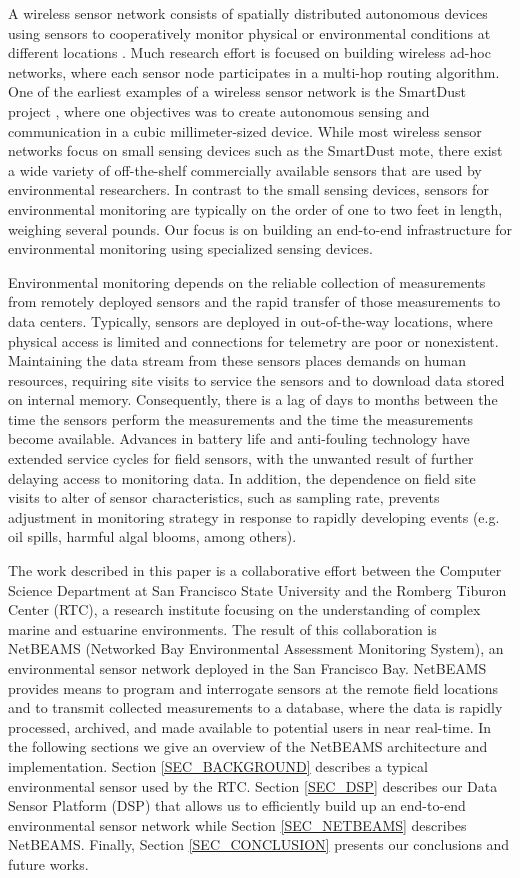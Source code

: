 \documentclass[conference]{IEEEtran}
\begin{document}
A wireless sensor network consists of spatially distributed autonomous
devices using sensors to cooperatively monitor physical or
environmental conditions at different locations \cite{roemer:2004}.
Much research effort is focused on building wireless ad-hoc networks, 
where each sensor node participates in a multi-hop routing algorithm.
One of the earliest examples of a wireless sensor network is the
SmartDust project \cite{smartdust:2001}, where one objectives was to
create autonomous sensing and communication in a cubic
millimeter-sized device.  While most wireless sensor networks focus on
small sensing devices such as the SmartDust mote, there exist a wide
variety of off-the-shelf commercially available sensors that are used
by environmental researchers. In contrast to the small sensing
devices, sensors for environmental monitoring are typically on the
order of one to two feet in length, weighing several pounds. Our
focus is on building an end-to-end infrastructure for environmental
monitoring using specialized sensing devices.

Environmental monitoring depends on the reliable collection of
measurements from remotely deployed sensors and the rapid transfer of
those measurements to data centers. Typically, sensors are deployed in
out-of-the-way locations, where physical access is limited and
connections for telemetry are poor or nonexistent. Maintaining the
data stream from these sensors places demands on human resources,
requiring site visits to service the sensors and to download data
stored on internal memory.  Consequently, there is a lag of days to
months between the time the sensors perform the measurements and the
time the measurements become available. Advances in battery life and
anti-fouling technology have extended service cycles for field
sensors, with the unwanted result of further delaying access to
monitoring data.  In addition, the dependence on field site visits to
alter of sensor characteristics, such as sampling rate, prevents
adjustment in monitoring strategy in response to rapidly developing
events (e.g. oil spills, harmful algal blooms, among others).

The work described in this paper is a collaborative effort between the
Computer Science Department at San Francisco State University and the
Romberg Tiburon Center (RTC), a research institute focusing on the
understanding of complex marine and estuarine environments. The result
of this collaboration is NetBEAMS (Networked Bay Environmental
Assessment Monitoring System), an environmental sensor network
deployed in the San Francisco Bay. NetBEAMS provides means to program
and interrogate sensors at the remote field locations and to transmit
collected measurements to a database, where the data is rapidly
processed, archived, and made available to potential users in near
real-time. In the following sections we give an overview of the NetBEAMS
architecture and implementation.  Section \ref{SEC_BACKGROUND}
describes a typical environmental sensor used by the RTC. Section
\ref{SEC_DSP} describes our Data Sensor Platform (DSP) that allows us
to efficiently build up an end-to-end environmental sensor network while
Section \ref{SEC_NETBEAMS} describes NetBEAMS. Finally, Section 
\ref{SEC_CONCLUSION} presents our conclusions and future works.
\end{document}
